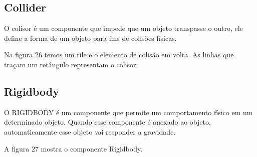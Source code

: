 \subsection{Collider}
O colisor é um componente que impede que um objeto transpasse o outro, ele define a forma de um objeto para fins de colisões físicas.

	Na figura 26 temos um tile e o elemento de colisão em volta. As linhas que traçam um retângulo representam o colisor.
	\begin{figure}[h!]
		\centering
	\end{figure}



\subsection{Rigidbody}


O RIGIDBODY é um componente que permite um comportamento físico em um determinado objeto. Quando esse componente é anexado ao objeto, automaticamente esse objeto vai responder a gravidade.

A figura 27 mostra o componente Rigidbody.
	
	\begin{figure}[h!]
		\centering
	\end{figure}




